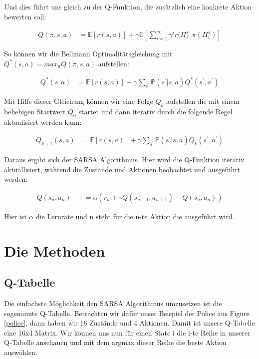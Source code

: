 Und dies führt uns gleich zu der Q-Funktion, die zusätzlich eine konkrete Aktion bewerten soll:

\begin{align}
	Q(\pi, s, a) 	&= \mathbb{E}[r(s,a)] + \gamma \mathbb{E}[\sum\limits_{i=1}^{\infty} \gamma^{i} r(\Pi_{i}^{s},\pi(\Pi_{i}^{s})] 
\end{align}

So können wir die Bellmann Optimalitätsgleichung mit $Q^{*}(s,a) = max_{\pi}Q(\pi,s,a)$ aufstellen:

\begin{align}
	Q^{*}(s, a) 	&= \mathbb{E}[r(s,a)] + \gamma \sum\limits_{s^{\prime}} \mathbb{P}(s^{\prime} | s, a ) Q^{*}(s^{\prime}, a^{\prime})
\end{align}

Mit Hilfe dieser Gleichung können wir eine Folge $Q_k$ aufstellen die mit einem beliebigen Startwert $Q_{0}$ startet und dann iterativ durch die folgende Regel aktualisiert werden kann:

\begin{align}
	Q_{k+1}(s, a) &= \mathbb{E}[r(s,a)] + \gamma \sum\limits_{s^{\prime}} \mathbb{P}(s^{\prime} | s, a ) Q_{k}(s^{\prime}, a^{\prime})
\end{align}

Daraus ergibt sich der SARSA Algorithmus. Hier wird die Q-Funktion iterativ aktuallisiert, während die Zustände und Aktionen beobachtet und ausgeführt werden:

\begin{align}
	Q(s_{n}, a_{n}) \: &+= \alpha ( r_n + \gamma Q(s_{n+1}, a_{n+1}) -  Q(s_n, a_n) ) \label{SARSA}
\end{align}

Hier ist $\alpha$ die Lernrate und n steht für die n-te Aktion die ausgeführt wird.

\section{Die Methoden}
\label{sec:methoden}

\subsection{Q-Tabelle}
\label{subsec:Q-Tabelle}

Die einfachste Möglichkeit den SARSA Algorithmus umzusetzen ist die sogenannte Q-Tabelle. Betrachten wir dafür unser Beispiel der Police aus Figure \ref{police}, dann haben wir 16 Zustände und 4 Aktionen. Damit ist unsere Q-Tabelle eine 16x4 Matrix. Wir können uns nun für einen State i die i-te Reihe in unserer Q-Tabelle anschauen und mit dem argmax dieser Reihe die beste Aktion auswählen. \\

